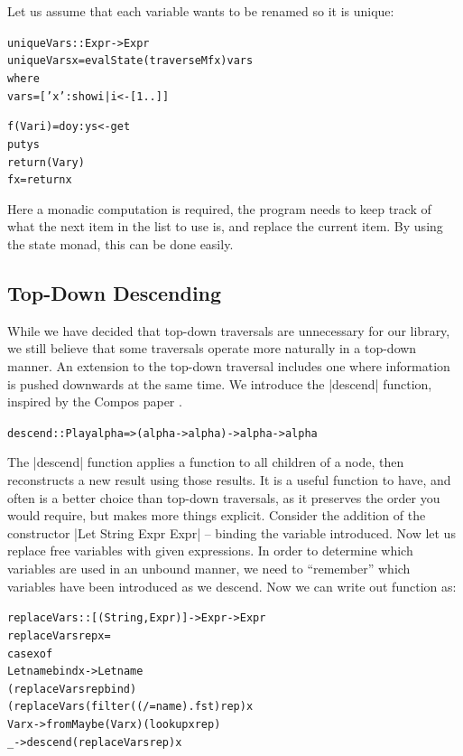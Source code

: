 \documentclass[preprint]{sigplanconf}
\newenvironment{code}{\begin{alltt}\small}{\end{alltt}}
\begin{document}
Let us assume that each variable wants to be renamed so it is unique:

\begin{code}
uniqueVars :: Expr -> Expr
uniqueVars x = evalState (traverseM f x) vars
    where
        vars = ['x':show i | i <- [1..]]

        f (Var i)  = do  y:ys <- get
                         put ys
                         return (Var y)
        f x        = return x
\end{code}

Here a monadic computation is required, the program needs to keep track of what the next item in the list to use is, and replace the current item. By using the state monad, this can be done easily.

\subsection{Top-Down Descending}

While we have decided that top-down traversals are unnecessary for our library, we still believe that some traversals operate more naturally in a top-down manner. An extension to the top-down traversal includes one where information is pushed downwards at the same time. We introduce the |descend| function, inspired by the Compos paper \cite{bringert:compos}.

\begin{code}
descend :: Play alpha => (alpha -> alpha) -> alpha -> alpha
\end{code}

The |descend| function applies a function to all children of a node, then reconstructs a new result using those results. It is a useful function to have, and often is a better choice than top-down traversals, as it preserves the order you would require, but makes more things explicit.
Consider the addition of the constructor |Let String Expr Expr| -- binding the variable introduced. Now let us replace free variables with given expressions. In order to determine which variables are used in an unbound manner, we need to ``remember'' which variables have been introduced as we descend. Now we can write out function as:

\begin{code}
replaceVars :: [(String,Expr)] -> Expr -> Expr
replaceVars rep x =
    case  x of
          Let name bind x -> Let name
              (replaceVars rep bind)
              (replaceVars (filter ((/= name) . fst) rep) x
          Var x -> fromMaybe (Var x) (lookup x rep)
          _ -> descend (replaceVars rep) x
\end{code}
\end{document}
